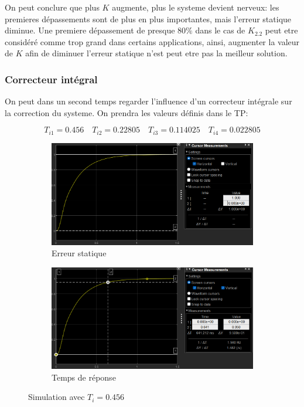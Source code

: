 \documentclass[12pt, a4paper]{report}
\begin{document}
On peut conclure que plus $K$ augmente, plus le systeme devient nerveux: les premieres dépassements sont de plus en plus importantes, mais l'erreur statique diminue.
Une premiere dépassement de presque $80\%$ dans le cas de $K_{2.2}$ peut etre considéré comme trop grand dans certains applications, ainsi, augmenter la valeur de $K$ afin de 
diminuer l'erreur statique n'est peut etre pas la meilleur solution.

\subsubsection{Correcteur intégral}
On peut dans un second temps regarder l'influence d'un correcteur intégrale sur la correction du systeme. On prendra les valeurs définis dans le TP:

\[
    T_{i1} = 0.456 \quad T_{i2} = 0.22805 \quad T_{i3} = 0.114025 \quad T_{i4} = 0.022805
\]

\begin{figure}[H]
    \begin{subfigure}[h!]{0.4\linewidth}
        \includegraphics[width=\linewidth]{sim2ti1erreur.png}
        \caption{Erreur statique}
    \end{subfigure}
    \hfill    
    \begin{subfigure}[h!]{0.4\linewidth}
        \includegraphics[width=\linewidth]{sim2ti1tr.png}
        \caption{Temps de réponse}
    \end{subfigure}
    \caption{Simulation avec $T_i = 0.456$}
    \label{fig:sim2KTi1}
\end{figure}
\end{document}
